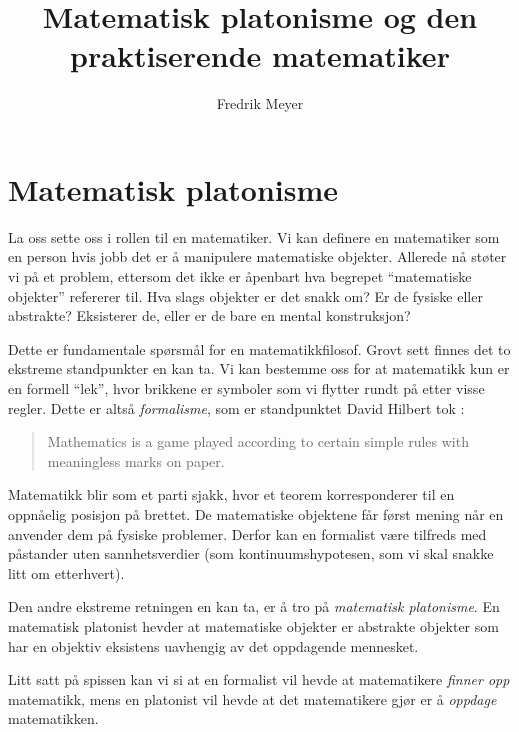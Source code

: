 \documentclass[12pt, norsk]{article}
\begin{document}
\title{Matematisk platonisme og den praktiserende matematiker}
\author{Fredrik Meyer}
\maketitle 


\section{Matematisk platonisme}

La oss sette oss i rollen til en matematiker. Vi kan definere en matematiker som en person hvis jobb det er å manipulere matematiske objekter. Allerede nå støter vi på et problem, ettersom det ikke er åpenbart hva  begrepet ``matematiske objekter'' refererer til. Hva slags objekter er det snakk om? Er de fysiske eller abstrakte? Eksisterer de, eller er de bare en mental konstruksjon?

Dette er fundamentale spørsmål for en matematikkfilosof. Grovt sett finnes det to ekstreme standpunkter en kan ta. Vi kan bestemme oss for at matematikk kun er en formell ``lek'', hvor brikkene er symboler som vi flytter rundt på etter visse regler. Dette er altså \emph{formalisme}, som er standpunktet David Hilbert tok \cite{hilbert_quote}:

\begin{quote}Mathematics is a game played according to certain simple rules with meaningless marks on paper.
\end{quote}

Matematikk blir som et parti sjakk, hvor et teorem korresponderer til en oppnåelig posisjon på brettet. De matematiske objektene får først mening når en anvender dem på fysiske problemer. Derfor kan en formalist være tilfreds med påstander uten sannhetsverdier (som kontinuumshypotesen, som vi skal snakke litt om etterhvert).

Den andre ekstreme retningen en kan ta, er å tro på \emph{matematisk platonisme}. En matematisk platonist hevder at matematiske objekter er abstrakte objekter som har en objektiv eksistens uavhengig av det oppdagende mennesket.

Litt satt på spissen kan vi si at en formalist vil hevde at matematikere \emph{finner opp} matematikk, mens en platonist vil hevde at det matematikere gjør er å \emph{oppdage} matematikken.
\end{document}
